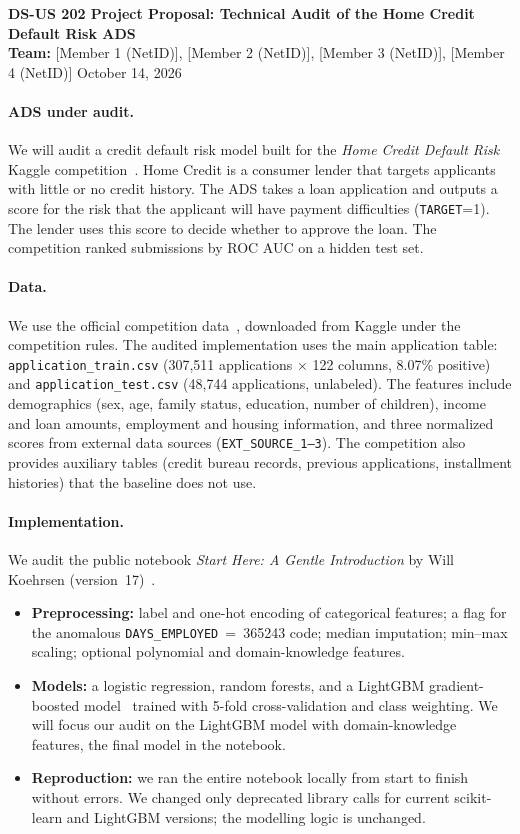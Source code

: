 \documentclass[10pt]{article}
\begin{document}
{\large\bfseries DS-US 202 Project Proposal: Technical Audit of the Home Credit Default Risk ADS}\\[2pt]
\textbf{Team:} [Member 1 (NetID)], [Member 2 (NetID)], [Member 3 (NetID)], [Member 4 (NetID)] \hfill October 14, 2026

\paragraph{ADS under audit.}
We will audit a credit default risk model built for the \emph{Home Credit Default Risk} Kaggle competition~\cite{competition}.
Home Credit is a consumer lender that targets applicants with little or no credit history. The ADS takes a loan application
and outputs a score for the risk that the applicant will have payment difficulties (\texttt{TARGET}=1). The lender uses this
score to decide whether to approve the loan. The competition ranked submissions by ROC AUC on a hidden test set.

\paragraph{Data.}
We use the official competition data~\cite{competition}, downloaded from Kaggle under the competition rules. The audited
implementation uses the main application table: \texttt{application\_train.csv} (307,511 applications $\times$ 122 columns,
8.07\% positive) and \texttt{application\_test.csv} (48,744 applications, unlabeled). The features include demographics
(sex, age, family status, education, number of children), income and loan amounts, employment and housing information, and
three normalized scores from external data sources (\texttt{EXT\_SOURCE\_1--3}). The competition also provides auxiliary tables
(credit bureau records, previous applications, installment histories) that the baseline does not use.

\paragraph{Implementation.}
We audit the public notebook \emph{Start Here: A Gentle Introduction} by Will Koehrsen (version~17)~\cite{koehrsen}.
\begin{itemize}
  \item \textbf{Preprocessing:} label and one-hot encoding of categorical features; a flag for the anomalous
        \texttt{DAYS\_EMPLOYED}~=~365243 code; median imputation; min--max scaling; optional polynomial and domain-knowledge features.
  \item \textbf{Models:} a logistic regression, random forests, and a LightGBM gradient-boosted model~\cite{lightgbm}
        trained with 5-fold cross-validation and class weighting. We will focus our audit on the LightGBM model
        with domain-knowledge features, the final model in the notebook.
  \item \textbf{Reproduction:} we ran the entire notebook locally from start to finish without errors.
        We changed only deprecated library calls for current
        scikit-learn and LightGBM versions; the modelling logic is unchanged.
\end{itemize}
\end{document}
